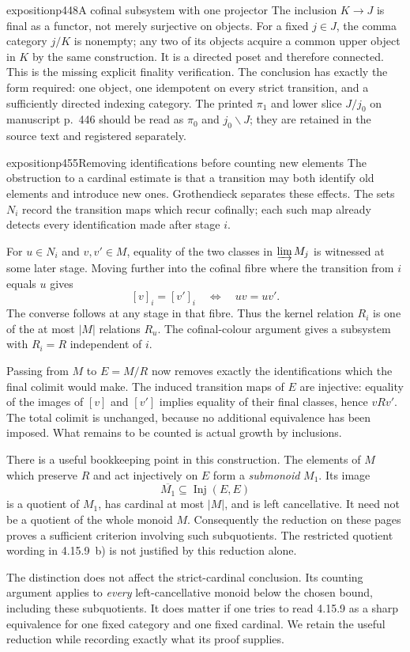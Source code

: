 \begin{dcomment}{exposition}{p448}{A cofinal subsystem with one projector}
The inclusion $K\to J$ is final as a functor, not merely surjective on objects. For a fixed $j\in J$, the comma category $j/K$ is nonempty; any two of its objects acquire a common upper object in $K$ by the same construction. It is a directed poset and therefore connected. This is the missing explicit finality verification. The conclusion has exactly the form required: one object, one idempotent on every strict transition, and a sufficiently directed indexing category. The printed $\pi_1$ and lower slice $J/j_0$ on manuscript p.~446 should be read as $\pi_0$ and $j_0\backslash J$; they are retained in the source text and registered separately.
\end{dcomment}

\begin{dcomment}{exposition}{p455}{Removing identifications before counting new elements}
The obstruction to a cardinal estimate is that a transition may both identify old elements and introduce new ones. Grothendieck separates these effects. The sets $N_i$ record the transition maps which recur cofinally; each such map already detects every identification made after stage $i$.

For $u\in N_i$ and $v,v'\in M$, equality of the two classes in $\varinjlim M_j$ is witnessed at some later stage. Moving further into the cofinal fibre where the transition from $i$ equals $u$ gives
\[
[v]_i=[v']_i\quad\Longleftrightarrow\quad uv=uv'.
\]
The converse follows at any stage in that fibre. Thus the kernel relation $R_i$ is one of the at most $|M|$ relations $R_u$. The cofinal-colour argument gives a subsystem with $R_i=R$ independent of $i$.

Passing from $M$ to $E=M/R$ now removes exactly the identifications which the final colimit would make. The induced transition maps of $E$ are injective: equality of the images of $[v]$ and $[v']$ implies equality of their final classes, hence $vRv'$. The total colimit is unchanged, because no additional equivalence has been imposed. What remains to be counted is actual growth by inclusions.

There is a useful bookkeeping point in this construction. The elements of $M$ which preserve $R$ and act injectively on $E$ form a \emph{submonoid} $M_1$. Its image
\[
\overline{M_1}\subseteq\operatorname{Inj}(E,E)
\]
is a quotient of $M_1$, has cardinal at most $|M|$, and is left cancellative. It need not be a quotient of the whole monoid $M$. Consequently the reduction on these pages proves a sufficient criterion involving such subquotients. The restricted quotient wording in 4.15.9~b) is not justified by this reduction alone.

The distinction does not affect the strict-cardinal conclusion. Its counting argument applies to \emph{every} left-cancellative monoid below the chosen bound, including these subquotients. It does matter if one tries to read 4.15.9 as a sharp equivalence for one fixed category and one fixed cardinal. We retain the useful reduction while recording exactly what its proof supplies.
\end{dcomment}

